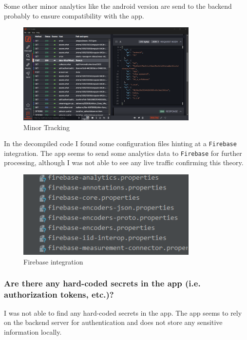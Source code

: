 \documentclass[12pt,a4paper]{article}
\begin{document}
Some other minor analytics like the android version are send to the backend probably to ensure compatibility with the app.

\begin{figure}[H]
\centering
\includegraphics[width=0.8\textwidth]{./screenshots/minor_tracking.png}
\caption{Minor Tracking}
\end{figure}

In the decompiled code I found some configuration files hinting at a \texttt{Firebase} integration. 
The app seems to send some analytics data to \texttt{Firebase} for further processing, although I was not able to see any live traffic confirming this theory.

\begin{figure}[H]
\centering
\includegraphics[width=0.8\textwidth]{./screenshots/Firebase_integration.png}
\caption{Firebase integration}
\end{figure}
 
\subsubsection{Are there any hard-coded secrets in the app (i.e. authorization tokens, etc.)?}

I was not able to find any hard-coded secrets in the app. The app seems to rely on the backend server for authentication and does not store any sensitive information locally.
\end{document}
